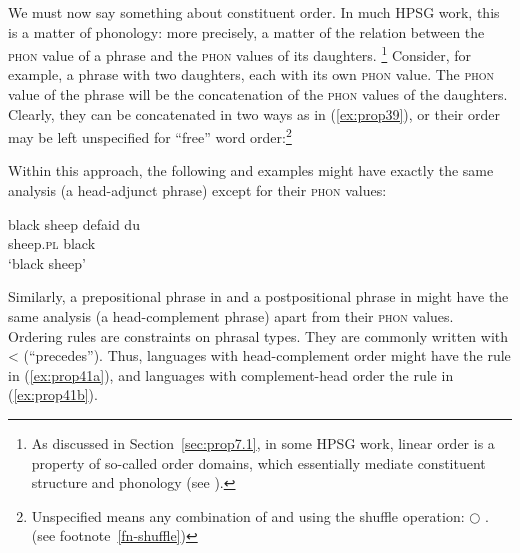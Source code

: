 \documentclass[output=paper,biblatex,babelshorthands,newtxmath,draftmode,colorlinks,citecolor=brown]{langscibook}
\begin{document}
We must now say something about constituent order. In much HPSG work, this is a matter of phonology:
more precisely, a matter of the relation between the \textsc{phon} value of a phrase and the
\textsc{phon} values of its daughters.%
%
\footnote{As discussed in Section~\ref{sec:prop7.1}, in some HPSG work, linear order is a property
  of so-called order domains, which essentially mediate constituent structure and phonology (see
  ). } 
%
Consider, for example, a phrase with two daughters, each with its own \textsc{phon} value. The
\textsc{phon} value of the phrase will be the concatenation of the \textsc{phon} values of the
daughters. Clearly, they can be concatenated in two ways as in (\ref{ex:prop39}),
or their order may be left unspecified for ``free'' word order:\footnote{
Unspecified means any combination of  and  using the shuffle operation: 
$\bigcirc$ . (see footnote~\ref{fn-shuffle})
}

\eal
\label{ex:prop39}\label{ex-phon-concatenation}
\ex
{}
\ex
{}
\zl

\noindent
Within this approach, the following  and  examples might have exactly the same analysis (a head-adjunct phrase) except for their \textsc{phon} values:

\eal\label{ex:prop40}
\ex\label{ex:prop40a}
black sheep
\ex\label{ex:prop40b}
\gll defaid            du\\
     sheep.\textsc{pl} black\\
\glt `black sheep'
\zl

\largerpage
\noindent
Similarly, a prepositional phrase in  and a postpositional phrase in  might have the same analysis (a head-complement phrase) apart from their \textsc{phon} values. Ordering rules are constraints on phrasal types. They are commonly written with < (``precedes''). Thus, languages with head-complement order might have the rule in (\ref{ex:prop41a}), and languages with complement-head order the rule in (\ref{ex:prop41b}).
\end{document}
